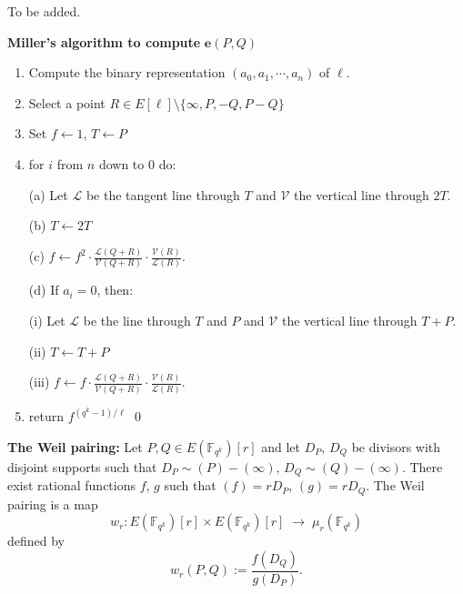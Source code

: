 \documentclass[11pt, lettersize, notitlepage, leqno, footskip=0.6cm]{article}
\newcommand{\bFqk}{\mathbb{F}_{q^k}}
\newcommand{\lra}{\longrightarrow}
\newcommand{\mc}{\mathcal}
\newcommand{\e}{\mathbf{e}}
\newcommand{\vs}{\vspace{-0.15cm}}
\newcommand{\noin}{\noindent}
\numberwithin{equation}{section}
\begin{document}
\begin{prf} To be added.  \end{prf}


\begin{mdframed} \textbf{Miller's algorithm to compute } $\e(P,Q)$

\begin{enumerate}[wide, labelwidth=!, labelindent=0pt]\vs \item Compute the binary representation $(a_0,a_1,\cdots,a_n)$ of $\ell$.

\item Select a point $R\in E[\ell]\setminus \{\infty, P, -Q, P-Q \}$

\item Set $f\gets 1$, $T\gets P$

\item for $i$ from $n$ down to $0$ do:

\noin (a) Let $\mc{L}$ be the tangent line through $T$ and $\mc{V}$ the vertical line through $2T$.

\noin (b) $T \gets 2T$

\noin (c) $f\gets f^2\cdot \frac{\mc{L}(Q+R)}{\mc{V}(Q+R)}\cdot \frac{\mc{V}(R)}{\mc{L}(R)}$.

\noin (d) If $a_i = 0$, then:

(i) Let $\mc{L}$ be the line through $T$ and $P$ and $\mc{V}$ the vertical line through $T+P$.

(ii) $T\gets T+P$

(iii) $f\gets f\cdot \frac{\mc{L}(Q+R)}{\mc{V}(Q+R)}\cdot \frac{\mc{V}(R)}{\mc{L}(R)}$.

\item return $f^{(q^{k}-1)/\ell}$ \qed \end{enumerate} \end{mdframed}

\bigskip








    
\bigskip



\noin \textbf{The Weil pairing:} Let $P, Q \in E(\bFqk)[r]$ and let $D_P$, $D_Q$ be divisors with disjoint supports such that $D_P \sim (P) - (\infty) $, $D_Q \sim (Q) - (\infty) $. There exist rational functions $f$, $g$ such that $(f) = rD_P$, $(g) = rD_Q$. The Weil pairing is a map \vs $$w_r: E(\bFqk)[r]\times E(\bFqk)[r]\;\lra \; \mu_r(\bFqk) $$ defined by \vs $$w_r(P,Q):= \frac{f(D_Q)}{g(D_P)}. $$
\end{document}
